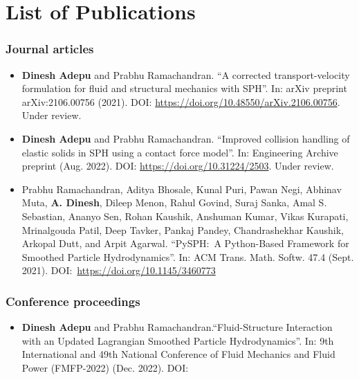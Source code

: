 \chapter{List of Publications}%
\label{chap:lop}

\subsection*{Journal articles}

\begin{itemize}
\item \textbf{Dinesh Adepu} and Prabhu Ramachandran. ``A corrected
  transport-velocity formulation for fluid and structural mechanics with
  SPH''. In: arXiv preprint arXiv:2106.00756
  (2021). DOI: \url{https://doi.org/10.48550/arXiv.2106.00756}. Under review.


\item \textbf{Dinesh Adepu} and Prabhu Ramachandran. ``Improved collision
  handling of elastic solids in SPH using a contact force model''. In:
  Engineering Archive preprint
  (Aug. 2022). DOI: \url{https://doi.org/10.31224/2503}. Under review.

\item Prabhu Ramachandran, Aditya Bhosale, Kunal Puri, Pawan Negi, Abhinav Muta,
  \textbf{A. Dinesh}, Dileep Menon, Rahul Govind, Suraj Sanka, Amal S. Sebastian, Ananyo
  Sen, Rohan Kaushik, Anshuman Kumar, Vikas Kurapati, Mrinalgouda Patil, Deep
  Tavker, Pankaj Pandey, Chandrashekhar Kaushik, Arkopal Dutt, and Arpit
  Agarwal. ``PySPH:~A Python-Based Framework for Smoothed Particle
  Hydrodynamics''. In: ACM Trans. Math. Softw. 47.4
  (Sept. 2021). DOI:~\url{https://doi.org/10.1145/3460773}
\end{itemize}


\subsection*{Conference proceedings}
\label{sec:conf-proc}
\begin{itemize}
\item \textbf{Dinesh Adepu} and Prabhu Ramachandran.``Fluid-Structure
  Interaction with an Updated Lagrangian Smoothed Particle Hydrodynamics''. In:
  9th International and 49th National Conference of Fluid Mechanics and Fluid
  Power (FMFP-2022) (Dec. 2022). DOI:
\end{itemize}
